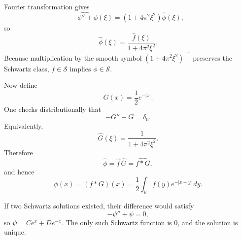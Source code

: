 \begin{solution}
Fourier transformation gives
\[
\widehat{-\phi''+\phi}(\xi)
=
(1+4\pi^2\xi^2)\widehat\phi(\xi),
\]
so
\[
\boxed{
\widehat\phi(\xi)
=
\frac{\widehat f(\xi)}{1+4\pi^2\xi^2}.
}
\]
Because multiplication by the smooth symbol
\((1+4\pi^2\xi^2)^{-1}\) preserves the Schwartz class,
\(f\in\mathcal S\) implies \(\phi\in\mathcal S\).

Now define
\[
G(x)=\frac12e^{-|x|}.
\]
One checks distributionally that
\[
-G''+G=\delta_0.
\]
Equivalently,
\[
\widehat G(\xi)
=
\frac1{1+4\pi^2\xi^2}.
\]
Therefore
\[
\widehat\phi
=
\widehat f\,\widehat G
=
\widehat{f*G},
\]
and hence
\[
\boxed{
\phi(x)
=
(f*G)(x)
=
\frac12\int_{\mathbb R}f(y)e^{-|x-y|}\,dy.
}
\]

If two Schwartz solutions existed, their difference would satisfy
\[
-\psi''+\psi=0,
\]
so \(\psi=Ce^x+De^{-x}\).  The only such Schwartz function is \(0\), and
the solution is unique.
\end{solution}


